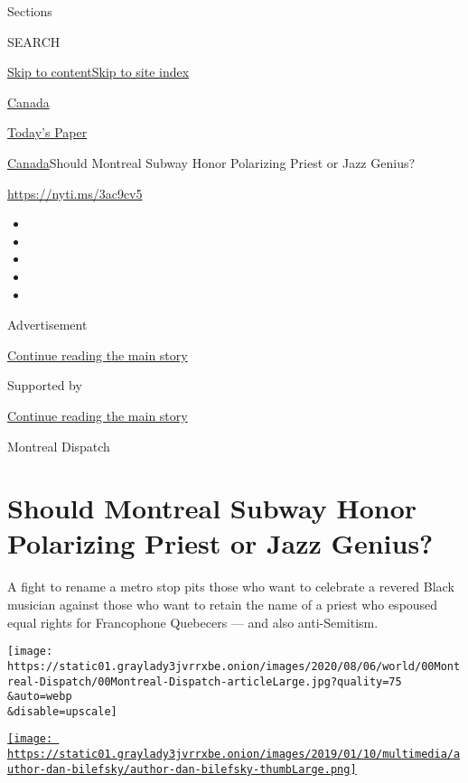Sections

SEARCH

\protect\hyperlink{site-content}{Skip to
content}\protect\hyperlink{site-index}{Skip to site index}

\href{https://www.nytimes3xbfgragh.onion/section/world/canada}{Canada}

\href{https://myaccount.nytimes3xbfgragh.onion/auth/login?response_type=cookie\&client_id=vi}{}

\href{https://www.nytimes3xbfgragh.onion/section/todayspaper}{Today's
Paper}

\href{/section/world/canada}{Canada}\textbar{}Should Montreal Subway
Honor Polarizing Priest or Jazz Genius?

\url{https://nyti.ms/3ac9cv5}

\begin{itemize}
\item
\item
\item
\item
\item
\end{itemize}

Advertisement

\protect\hyperlink{after-top}{Continue reading the main story}

Supported by

\protect\hyperlink{after-sponsor}{Continue reading the main story}

Montreal Dispatch

\hypertarget{should-montreal-subway-honor-polarizing-priest-or-jazz-genius}{%
\section{Should Montreal Subway Honor Polarizing Priest or Jazz
Genius?}\label{should-montreal-subway-honor-polarizing-priest-or-jazz-genius}}

A fight to rename a metro stop pits those who want to celebrate a
revered Black musician against those who want to retain the name of a
priest who espoused equal rights for Francophone Quebecers --- and also
anti-Semitism.

\texttt{[image: https://static01.graylady3jvrrxbe.onion/images/2020/08/06/world/00Montreal-Dispatch/00Montreal-Dispatch-articleLarge.jpg?quality=75\\\&auto=webp\\\&disable=upscale]}

\href{https://www.nytimes3xbfgragh.onion/by/dan-bilefsky}{\texttt{[image: https://static01.graylady3jvrrxbe.onion/images/2019/01/10/multimedia/author-dan-bilefsky/author-dan-bilefsky-thumbLarge.png]}}

